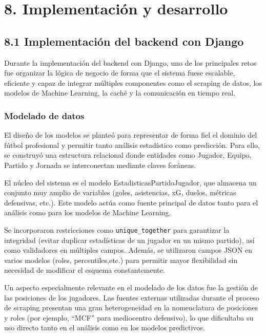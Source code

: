 \section*{8. Implementación y desarrollo}

\subsection{8.1 Implementación del backend con Django}

Durante la implementación del backend con Django, uno de los principales retos fue 
organizar la lógica de negocio de forma que el sistema fuese escalable, eficiente y 
capaz de integrar múltiples componentes como el scraping de datos, los modelos de 
Machine Learning, la caché y la comunicación en tiempo real.

\subsubsection{Modelado de datos}

El diseño de los modelos se planteó para representar de forma fiel el dominio del 
fútbol profesional y permitir tanto análisis estadístico como predicción. Para ello,
 se construyó una estructura relacional donde entidades como Jugador, Equipo, Partido
  y Jornada se interconectan mediante claves foráneas.

El núcleo del sistema es el modelo EstadisticasPartidoJugador, que almacena un 
conjunto muy amplio de variables (goles, asistencias, xG, duelos, métricas defensivas, 
etc.). Este modelo actúa como fuente principal de datos tanto para el análisis como
 para los modelos de Machine Learning.

Se incorporaron restricciones como \texttt{unique\_together} para garantizar la 
integridad (evitar duplicar estadísticas de un jugador en un mismo partido), 
así como validadores en múltiples campos. Además, se utilizaron campos JSON en varios modelos
 (roles, percentiles,etc.) para permitir mayor flexibilidad sin necesidad de 
 modificar el esquema constantemente.

Un aspecto especialmente relevante en el modelado de los datos fue la gestión de las posiciones
 de los jugadores. Las fuentes externas utilizadas durante el proceso de scraping presentan una 
 gran heterogeneidad en la nomenclatura de posiciones y roles (por ejemplo, ``MCF'' para mediocentro
  defensivo), lo que dificultaba su uso directo tanto en el análisis como en los modelos predictivos.

